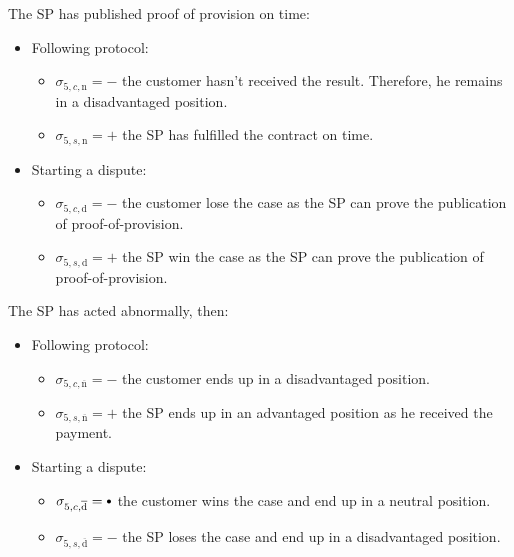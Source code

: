 \documentclass{ieeeaccess}
\newcommand\sbullet[1][.75]{\mathbin{\ThisStyle{\vcenter{\hbox{%
  \scalebox{#1}{$\SavedStyle\bullet$}}}}}%
}
\begin{document}
The SP has published proof of provision on time:

\begin{itemize}
\item
  Following protocol:

  \begin{itemize}
  
  \item
    \(\sigma_{5, c, \mathrm{n}} = -\) the customer hasn't received the
    result. Therefore, he remains in a disadvantaged position.
  \item
    \(\sigma_{5, s, \mathrm{n}} = +\) the SP has fulfilled the contract
    on time.
  \end{itemize}
\item
  Starting a dispute:

  \begin{itemize}
  
  \item
    \(\sigma_{5, c, \mathrm{d}} = -\) the customer lose the case as the
    SP can prove the publication of proof-of-provision.
  \item
    \(\sigma_{5, s, \mathrm{d}} = +\) the SP win the case as the SP can
    prove the publication of proof-of-provision.
  \end{itemize}
\end{itemize}

The SP has acted abnormally, then:

\begin{itemize}
\item
  Following protocol:

  \begin{itemize}
  
  \item
    \(\sigma_{5, c, \overline{\mathrm{n}}} = -\) the customer ends up in a disadvantaged position.
  \item
    \(\sigma_{5, s, \overline{\mathrm{n}}} = +\) the SP ends up in
    an advantaged position as he received the payment.
  \end{itemize}
\item
  Starting a dispute:

  \begin{itemize}
  
  \item
    \(\sigma_{5, c, \overline{\mathrm{d}}} = \sbullet\) the customer wins the
    case and end up in a neutral position.
  \item
    \(\sigma_{5, s, \overline{\mathrm{d}}} = -\) the SP loses the case
    and end up in a disadvantaged position.
  \end{itemize}
\end{itemize}
\end{document}

